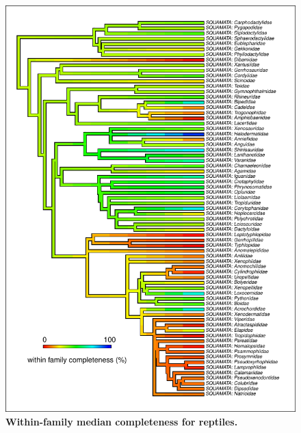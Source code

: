 \documentclass[11pt]{article}
\begin{document}
\pagebreak

\begin{figure}[h!]
\centering
\includegraphics[scale=1.2]{figures/NA_phylo_patterns/Reptiles_completeness}
\caption[Within-family median completeness for reptiles]{\textbf{Within-family median completeness for reptiles.}}
\label{}
\end{figure}
\end{document}
